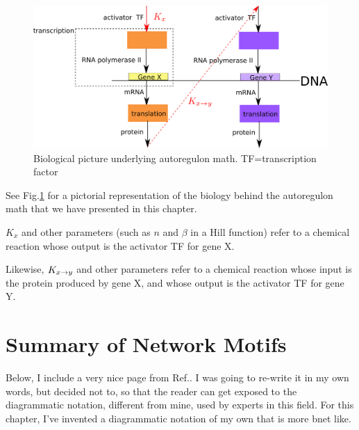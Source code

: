 \begin{figure}[h!]
\centering
\includegraphics[width=5in]
{autoregulons/autoreg-bio.png}
\caption{Biological picture underlying
autoregulon math.  TF=transcription factor}
\label{fig-autoreg-bio}
\end{figure}

See Fig.\ref{fig-autoreg-bio} for a 
pictorial representation
of the biology behind the autoregulon
math that we have presented in this chapter.

$K_{x}$ and other parameters (such as $n$ and $\beta$
in a Hill function)
refer to a chemical reaction
whose output is the activator TF
for gene X.

Likewise, $K_{x\rightarrow y}$
and other parameters
refer to a 
chemical reaction whose input is the protein produced by gene X,
and whose output is the
activator TF for gene Y.


\section{Summary of Network Motifs}
Below, I include a very nice page from Ref.\cite{alon-book}.
I was going to re-write it in my own words, but
decided not to, so that the reader can get exposed to
the diagrammatic  notation, different from mine, used by experts in this field.
For this chapter, I've invented a diagrammatic
notation of my own that is more bnet like.
\newpage

